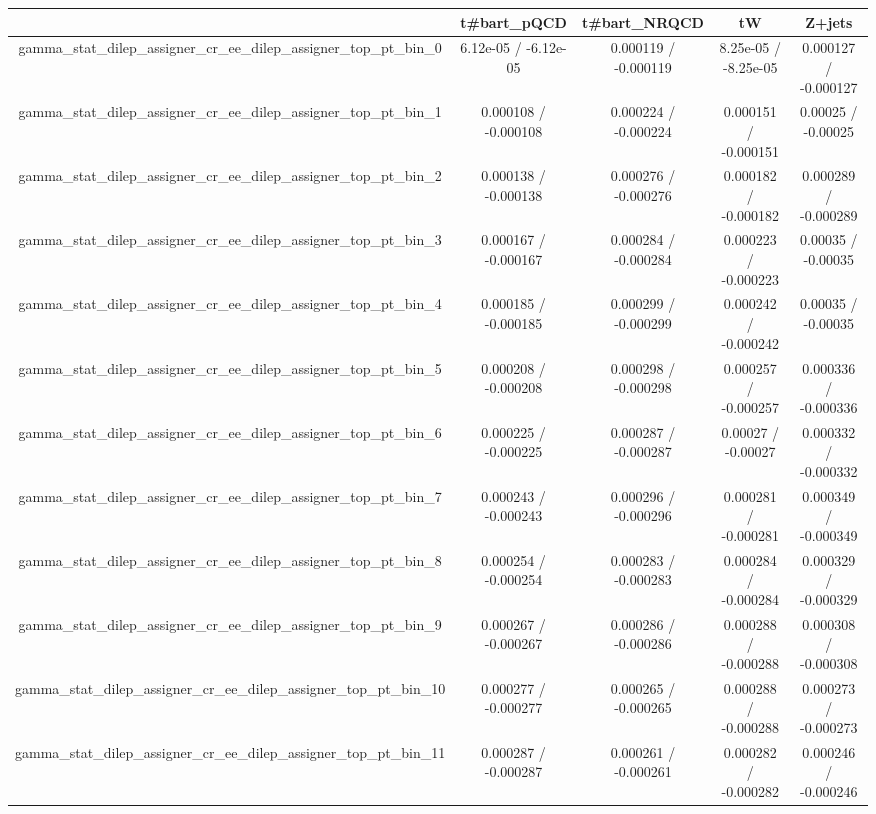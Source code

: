 \documentclass[10pt]{article}
\begin{document}
\begin{table}[htbp]
\begin{center}
\begin{tabular}{|c|c|c|c|c|}
\hline 
      & t#bar{t}_{pQCD}      & t#bar{t}_{NRQCD}      & tW      & Z+jets \\ 
\hline 
  gamma_stat_dilep_assigner_cr_ee_dilep_assigner_top_pt_bin_0 & 6.12e-05 / -6.12e-05 & 0.000119 / -0.000119 & 8.25e-05 / -8.25e-05 & 0.000127 / -0.000127 \\ 
  gamma_stat_dilep_assigner_cr_ee_dilep_assigner_top_pt_bin_1 & 0.000108 / -0.000108 & 0.000224 / -0.000224 & 0.000151 / -0.000151 & 0.00025 / -0.00025 \\ 
  gamma_stat_dilep_assigner_cr_ee_dilep_assigner_top_pt_bin_2 & 0.000138 / -0.000138 & 0.000276 / -0.000276 & 0.000182 / -0.000182 & 0.000289 / -0.000289 \\ 
  gamma_stat_dilep_assigner_cr_ee_dilep_assigner_top_pt_bin_3 & 0.000167 / -0.000167 & 0.000284 / -0.000284 & 0.000223 / -0.000223 & 0.00035 / -0.00035 \\ 
  gamma_stat_dilep_assigner_cr_ee_dilep_assigner_top_pt_bin_4 & 0.000185 / -0.000185 & 0.000299 / -0.000299 & 0.000242 / -0.000242 & 0.00035 / -0.00035 \\ 
  gamma_stat_dilep_assigner_cr_ee_dilep_assigner_top_pt_bin_5 & 0.000208 / -0.000208 & 0.000298 / -0.000298 & 0.000257 / -0.000257 & 0.000336 / -0.000336 \\ 
  gamma_stat_dilep_assigner_cr_ee_dilep_assigner_top_pt_bin_6 & 0.000225 / -0.000225 & 0.000287 / -0.000287 & 0.00027 / -0.00027 & 0.000332 / -0.000332 \\ 
  gamma_stat_dilep_assigner_cr_ee_dilep_assigner_top_pt_bin_7 & 0.000243 / -0.000243 & 0.000296 / -0.000296 & 0.000281 / -0.000281 & 0.000349 / -0.000349 \\ 
  gamma_stat_dilep_assigner_cr_ee_dilep_assigner_top_pt_bin_8 & 0.000254 / -0.000254 & 0.000283 / -0.000283 & 0.000284 / -0.000284 & 0.000329 / -0.000329 \\ 
  gamma_stat_dilep_assigner_cr_ee_dilep_assigner_top_pt_bin_9 & 0.000267 / -0.000267 & 0.000286 / -0.000286 & 0.000288 / -0.000288 & 0.000308 / -0.000308 \\ 
  gamma_stat_dilep_assigner_cr_ee_dilep_assigner_top_pt_bin_10 & 0.000277 / -0.000277 & 0.000265 / -0.000265 & 0.000288 / -0.000288 & 0.000273 / -0.000273 \\ 
  gamma_stat_dilep_assigner_cr_ee_dilep_assigner_top_pt_bin_11 & 0.000287 / -0.000287 & 0.000261 / -0.000261 & 0.000282 / -0.000282 & 0.000246 / -0.000246 \\ 

\end{tabular}
\end{center}
\end{table}
\end{document}
